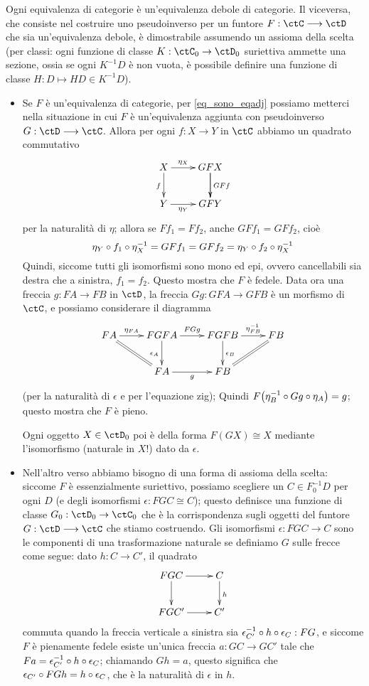 \begin{remark}\label{eq_implies_weq_AC_eq}
	Ogni equivalenza di categorie è un'equivalenza debole di categorie. Il viceversa, che consiste nel costruire uno pseudoinverso per un funtore \(F : \ctC\fun\ctD\) che sia un'equivalenza debole, è dimostrabile assumendo un assioma della scelta (per classi: ogni funzione di classe \(K : \ctC_0 \to \ctD_0\) suriettiva ammette una sezione, ossia se ogni \(K^{-1}D\) è non vuota, è possibile definire una funzione di classe \(H : D\mapsto HD \in K^{-1}D\)).
	\begin{itemize}
		\item Se \(F\) è un'equivalenza di categorie, per \ref{eq_sono_eqadj} possiamo metterci nella situazione in cui \(F\) è un'equivalenza aggiunta con pseudoinverso \(G : \ctD\fun\ctC\). Allora per ogni \(f : X\to Y\) in \(\ctC\) abbiamo un quadrato commutativo
		      \[\xymatrix{
			      X\ar[r]^-{\eta_X}\ar[d]_f & GFX \ar[d]\ar[d]^{GFf}\\
			      Y \ar[r]_-{\eta_Y} & GFY
			      }\]
		      per la naturalità di \(\eta\); allora se \(Ff_1 = Ff_2\), anche \(GFf_1 = GFf_2\), cioè
		      \[\eta_Y\circ f_1 \circ \eta_X^{-1} = GFf_1 = GFf_2 = \eta_Y\circ f_2 \circ \eta_X^{-1}\]
		      Quindi, siccome tutti gli isomorfismi sono mono ed epi, ovvero cancellabili sia destra che a sinistra, \(f_1 = f_2\). Questo mostra che \(F\) è fedele. Data ora una freccia \(g : FA\to FB\) in \(\ctD\), la freccia \(Gg : GFA\to GFB\) è un morfismo di \(\ctC\), e possiamo considerare il diagramma
		      \[\xymatrix{
			      FA \ar@{=}[dr]\ar[r]^-{\eta_{FA}}& FGFA \ar[d]_{\epsilon_A}\ar[r]^-{FGg} & FGFB \ar[d]^{\epsilon_B}\ar[r]^-{\eta_{FB}^{-1}}& FB \\
			      & FA \ar[r]_-g& FB \ar@{=}[ur]&
			      }\]
		      (per la naturalità di \(\epsilon\) e per l'equazione zig); Quindi \(F\big(\eta_B^{-1}\circ Gg\circ \eta_A\big) = g\); questo mostra che \(F\) è pieno.

		      Ogni oggetto \(X\in\ctD_0\) poi è della forma \(F(GX) \cong X\) mediante l'isomorfismo (naturale in \(X\)!) dato da \(\epsilon\).
		\item Nell'altro verso abbiamo bisogno di una forma di assioma della scelta: siccome \(F\) è essenzialmente suriettivo, possiamo scegliere un \(C\in F_0^{-1}D\) per ogni \(D\) (e degli isomorfismi \(\epsilon : FGC \cong C\)); questo definisce una funzione di classe \(G_0 : \ctD_0\to\ctC_0\) che è la corrispondenza sugli oggetti del funtore \(G : \ctD\fun\ctC\) che stiamo costruendo. Gli isomorfismi \(\epsilon : FGC \to C\) sono le componenti di una trasformazione naturale se definiamo \(G\) sulle frecce come segue: dato \(h : C\to C'\), il quadrato
		      \[\xymatrix{
				      FGC \ar[r]\ar[d]& C \ar[d]^h\\
				      FGC' \ar[r]& C'
			      }\]
		      commuta quando la freccia verticale a sinistra sia \(\epsilon_{C'}^{-1}\circ h\circ \epsilon_C : FG\), e siccome \(F\) è pienamente fedele esiste un'unica freccia \(a : GC \to GC'\) tale che \(Fa = \epsilon_{C'}^{-1}\circ h\circ \epsilon_C\); chiamando \(Gh=a\), questo significa che \(\epsilon_{C'}\circ FGh = h\circ \epsilon_C\), che è la naturalità di \(\epsilon\) in \(h\).


\end{itemize}
\end{remark}
